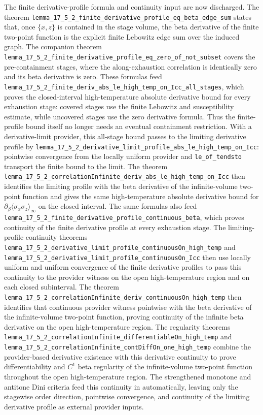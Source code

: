 \documentclass[a4paper,11pt]{article}
\begin{document}
The finite derivative-profile formula and continuity input are now discharged.
The theorem
\texttt{lemma\_17\_5\_2\_finite\_derivative\_profile\_eq\_beta\_edge\_sum}
states that, once \(\{x,z\}\) is contained in the stage volume, the beta
derivative of the finite two-point function is the explicit finite Lebowitz
edge sum over the induced graph.  The companion theorem
\texttt{lemma\_17\_5\_2\_finite\_derivative\_profile\_eq\_zero\_of\_not\_subset}
covers the pre-containment stages, where the along-exhaustion correlation is
identically zero and its beta derivative is zero.  These formulas feed
\texttt{lemma\_17\_5\_2\_finite\_deriv\_abs\_le\_high\_temp\_on\_Icc\_all\_stages},
which proves the closed-interval high-temperature absolute derivative bound
for every exhaustion stage: covered stages use the finite Lebowitz and
susceptibility estimate, while uncovered stages use the zero derivative
formula.  Thus the finite-profile bound itself no longer needs an eventual
containment restriction.  With a derivative-limit provider, this all-stage
bound passes to the limiting derivative profile by
\texttt{lemma\_17\_5\_2\_derivative\_limit\_profile\_abs\_le\_high\_temp\_on\_Icc}:
pointwise convergence from the locally uniform provider and
\texttt{le\_of\_tendsto} transport the finite bound to the limit.  The theorem
\texttt{lemma\_17\_5\_2\_correlationInfinite\_deriv\_abs\_le\_high\_temp\_on\_Icc}
then identifies the limiting profile with the beta derivative of the
infinite-volume two-point function and gives the same high-temperature absolute
derivative bound for \(\partial_\beta\langle\sigma_x\sigma_z\rangle_\infty\)
on the closed interval.  The same formulas also feed
\texttt{lemma\_17\_5\_2\_finite\_derivative\_profile\_continuous\_beta}, which
proves continuity of the finite derivative profile at every exhaustion stage.
The limiting-profile continuity theorems
\texttt{lemma\_17\_5\_2\_derivative\_limit\_profile\_continuousOn\_high\_temp}
and
\texttt{lemma\_17\_5\_2\_derivative\_limit\_profile\_continuousOn\_Icc}
then use locally uniform and uniform convergence of the finite derivative
profiles to pass this continuity to the provider witness on the open
high-temperature region and on each closed subinterval.  The theorem
\texttt{lemma\_17\_5\_2\_correlationInfinite\_deriv\_continuousOn\_high\_temp}
then identifies that continuous provider witness pointwise with the beta
derivative of the infinite-volume two-point function, proving continuity of the
infinite beta derivative on the open high-temperature region.  The regularity
theorems
\texttt{lemma\_17\_5\_2\_correlationInfinite\_differentiableOn\_high\_temp}
and
\texttt{lemma\_17\_5\_2\_correlationInfinite\_contDiffOn\_one\_high\_temp}
combine the provider-based derivative existence with this derivative
continuity to prove differentiability and \(C^1\) beta regularity of the
infinite-volume two-point function throughout the open high-temperature
region.  The strengthened
monotone and antitone Dini criteria feed this continuity in automatically,
leaving only the stagewise order direction, pointwise convergence, and
continuity of the limiting derivative profile as external provider inputs.
\end{document}
